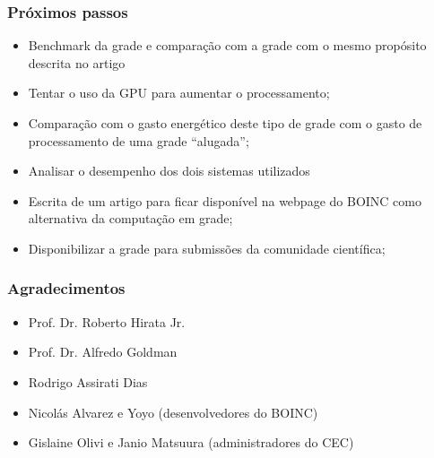 \documentclass{beamer}
\begin{document}
\begin{frame}
  \frametitle{Próximos passos}
  \begin{itemize}
    \item Benchmark da grade e comparação com a grade com o mesmo propósito descrita no artigo %
    \item Tentar o uso da GPU para aumentar o processamento;
    \item Comparação com o gasto energético deste tipo de grade com o gasto de processamento de uma grade ``alugada'';
    \item Analisar o desempenho dos dois sistemas utilizados
    \item Escrita de um artigo para ficar disponível na webpage do BOINC como alternativa da computação em grade;
    \item Disponibilizar a grade para submissões da comunidade científica;
  \end{itemize}
\end{frame}



\begin{frame}
  \frametitle{Agradecimentos}
  \begin{itemize}
    \item Prof. Dr. Roberto Hirata Jr.
    \item Prof. Dr. Alfredo Goldman
    \item Rodrigo Assirati Dias
    \item Nicolás Alvarez e Yoyo (desenvolvedores do BOINC)
    \item Gislaine Olivi e Janio Matsuura (administradores do CEC)
  \end{itemize}
\end{frame}
\end{document}

